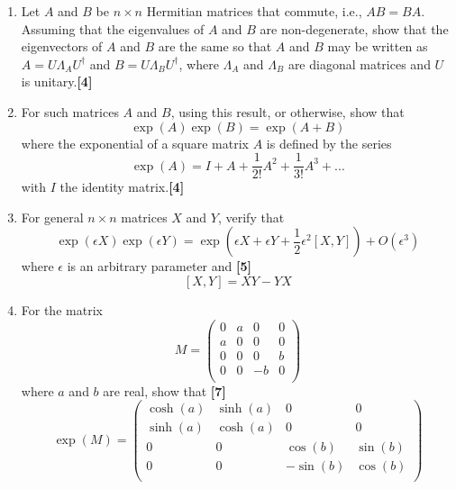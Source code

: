\documentclass[a4paper]{article}
\begin{document}
\begin{qns}\leavevmode
\begin{enumerate}[label=(\alph*)]
\item Let $A$ and $B$ be $n\times n$ Hermitian matrices that commute, i.e., $AB = BA$. Assuming that the eigenvalues of $A$ and $B$ are non-degenerate, show that the eigenvectors of $A$ and $B$ are the same so that $A$ and $B$ may be written as $A = U\Lambda_AU^\dag$ and $B = U\Lambda_BU^\dag$, where $\Lambda_A$ and $\Lambda_B$ are diagonal matrices and $U$ is unitary.\hfill \textbf{[4]}
\item For such matrices $A$ and $B$, using this result, or otherwise, show that
$$\exp(A) \exp(B) = \exp(A + B)$$
where the exponential of a square matrix $A$ is defined by the series
$$\exp(A)=I+A+\frac{1}{2!}A^2+\frac{1}{3!}A^3+...$$
with $I$ the identity matrix.\hfill \textbf{[4]}
\item For general $n\times n$ matrices $X$ and $Y$, verify that
$$\exp(\epsilon X)\exp(\epsilon Y)=\exp(\epsilon X+\epsilon Y+\frac{1}{2}\epsilon^2[X,Y])+O(\epsilon^3)$$
where $\epsilon$ is an arbitrary parameter and \hfill \textbf{[5]}
$$[X,Y]= XY − YX$$
\item For the matrix
$$M=\begin{pmatrix}0&a&0&0\\a&0&0&0\\0&0&0&b\\0&0&-b&0\\\end{pmatrix}$$
where $a$ and $b$ are real, show that \hfill \textbf{[7]}
$$\exp(M)=\begin{pmatrix}\cosh(a)&\sinh(a)&0&0\\\sinh(a)&\cosh(a)&0&0\\0&0&\cos(b)&\sin(b)\\0&0&-\sin(b)&\cos(b)\\\end{pmatrix}$$
\end{enumerate}
\end{qns}
\end{document}
